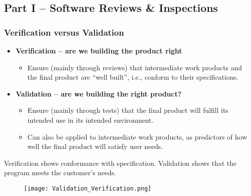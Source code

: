 \documentclass[../ESOF_notes.tex]{subfiles}
\begin{document}
\subsection{Part I – Software Reviews \& Inspections}
\subsubsection{Verification versus Validation}
\begin{itemize}
    \item \textbf{Verification – are we building the product right}
          \begin{itemize}
              \item Ensure (mainly through reviews) that intermediate
                    work products and the final product are “well built”, 
                    i.e., conform to their specifications.
          \end{itemize}
    \item \textbf{Validation – are we building the right product?}
          \begin{itemize}
              \item Ensure (mainly through tests) that the final
                    product will fulfill its intended use in its intended 
                    environment.
              \item Can also be applied to intermediate work products,
                    as predictors of how well the final product will satisfy 
                    user needs.
          \end{itemize}
\end{itemize}
Verification shows conformance with specification.
Validation shows that the program meets the customer’s needs.
\begin{figure}[h]
    \centering
    \texttt{[image: Validation\_Verification.png]}
\end{figure}
\end{document}
